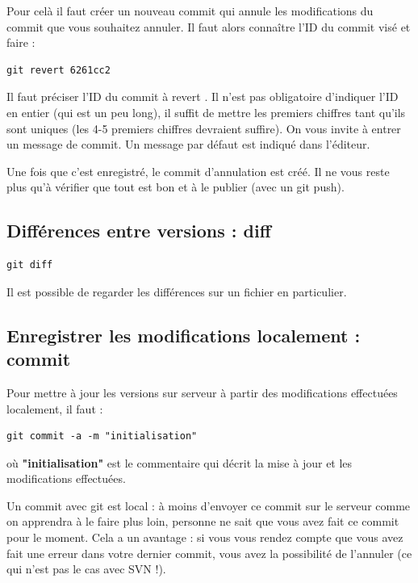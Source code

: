 \documentclass[a4paper,twoside]{article}
\begin{document}
Pour celà il faut créer un nouveau commit qui annule les modifications du commit que vous souhaitez annuler. Il faut alors connaître l'ID du commit visé et faire : 
\begin{verbatim}
git revert 6261cc2
\end{verbatim}
Il faut préciser l'ID du commit à \og revert \fg. Il n'est pas obligatoire d'indiquer l'ID en entier (qui est un peu long), il suffit de mettre les premiers chiffres tant qu'ils sont uniques (les 4-5 premiers chiffres devraient suffire). On vous invite à entrer un message de commit. Un message par défaut est indiqué dans l'éditeur.

Une fois que c'est enregistré, le commit d'annulation est créé. Il ne vous reste plus qu'à vérifier que tout est bon et à le publier (avec un git push).

\subsection{Différences entre versions : diff}

\begin{verbatim}
git diff
\end{verbatim}

\begin{remarque}
Il est possible de regarder les différences sur un fichier en particulier.
\end{remarque}

\subsection{Enregistrer les modifications localement : commit}\label{sec:commit}

Pour mettre à jour les versions sur serveur à partir des modifications effectuées localement, il faut : 
\begin{verbatim}
git commit -a -m "initialisation"
\end{verbatim}
où \textbf{"initialisation"} est le commentaire qui décrit la mise à jour et les modifications effectuées. 

\begin{attention}
Un commit avec git est local : à moins d'envoyer ce commit sur le serveur comme on apprendra à le faire plus loin, personne ne sait que vous avez fait ce commit pour le moment. Cela a un avantage : si vous vous rendez compte que vous avez fait une erreur dans votre dernier commit, vous avez la possibilité de l'annuler (ce qui n'est pas le cas avec SVN !).
\end{attention}
\end{document}

